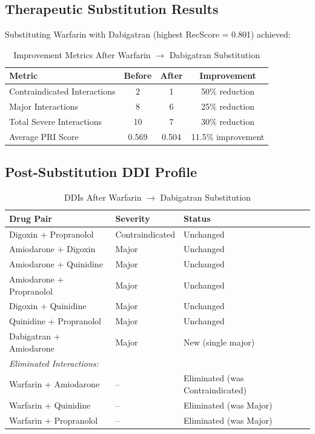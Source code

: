 \documentclass[11pt,a4paper]{article}
\begin{document}
\subsection{Therapeutic Substitution Results}

Substituting Warfarin with Dabigatran (highest RecScore = 0.801) achieved:

\begin{table}[H]
\centering
\caption{Improvement Metrics After Warfarin $\rightarrow$ Dabigatran Substitution}
\label{tab:improvement}
\begin{tabular}{lccc}
\toprule
\textbf{Metric} & \textbf{Before} & \textbf{After} & \textbf{Improvement} \\
\midrule
Contraindicated Interactions & 2 & 1 & 50\% reduction \\
Major Interactions & 8 & 6 & 25\% reduction \\
Total Severe Interactions & 10 & 7 & 30\% reduction \\
Average PRI Score & 0.569 & 0.504 & 11.5\% improvement \\
\bottomrule
\end{tabular}
\end{table}

\subsection{Post-Substitution DDI Profile}

\begin{table}[H]
\centering
\caption{DDIs After Warfarin $\rightarrow$ Dabigatran Substitution}
\label{tab:post_sub_ddi}
\begin{tabular}{lll}
\toprule
\textbf{Drug Pair} & \textbf{Severity} & \textbf{Status} \\
\midrule
Digoxin + Propranolol & Contraindicated & Unchanged \\
Amiodarone + Digoxin & Major & Unchanged \\
Amiodarone + Quinidine & Major & Unchanged \\
Amiodarone + Propranolol & Major & Unchanged \\
Digoxin + Quinidine & Major & Unchanged \\
Quinidine + Propranolol & Major & Unchanged \\
Dabigatran + Amiodarone & Major & New (single major) \\
\midrule
\multicolumn{3}{l}{\textit{Eliminated Interactions:}} \\
Warfarin + Amiodarone & -- & Eliminated (was Contraindicated) \\
Warfarin + Quinidine & -- & Eliminated (was Major) \\
Warfarin + Propranolol & -- & Eliminated (was Major) \\
\bottomrule
\end{tabular}
\end{table}
\end{document}
